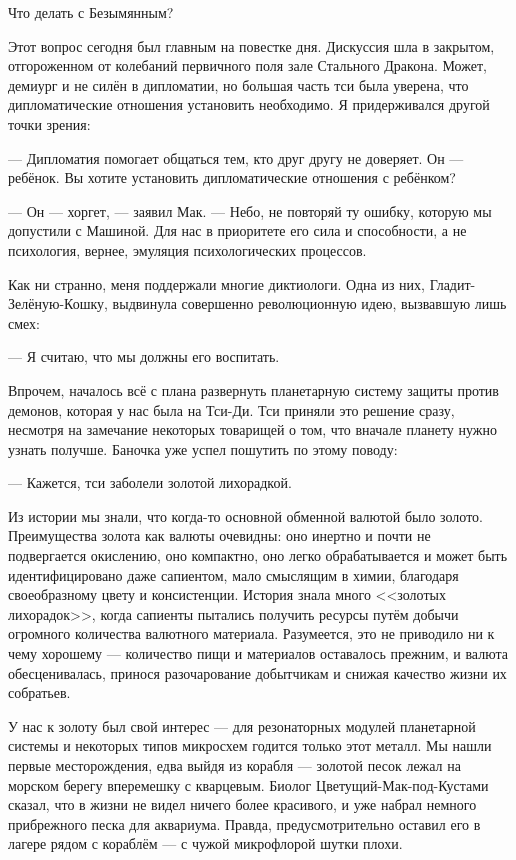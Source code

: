 Что делать с Безымянным?

Этот вопрос сегодня был главным на повестке дня.
Дискуссия шла в закрытом, отгороженном от колебаний первичного поля зале Стального Дракона.
Может, демиург и не силён в дипломатии, но большая часть тси была уверена, что дипломатические отношения установить необходимо.
Я придерживался другой точки зрения:

--- Дипломатия помогает общаться тем, кто друг другу не доверяет.
Он --- ребёнок.
Вы хотите установить дипломатические отношения с ребёнком?

--- Он --- хоргет, --- заявил Мак.
--- Небо, не повторяй ту ошибку, которую мы допустили с Машиной.
Для нас в приоритете его сила и способности, а не психология, вернее, эмуляция психологических процессов.

Как ни странно, меня поддержали многие диктиологи.
Одна из них, Гладит-Зелёную-Кошку, выдвинула совершенно революционную идею, вызвавшую лишь смех:

--- Я считаю, что мы должны его воспитать.

Впрочем, началось всё с плана развернуть планетарную систему защиты против демонов, которая у нас была на Тси-Ди.
Тси приняли это решение сразу, несмотря на замечание некоторых товарищей о том, что вначале планету нужно узнать получше.
Баночка уже успел пошутить по этому поводу:

--- Кажется, тси заболели золотой лихорадкой.

Из истории мы знали, что когда-то основной обменной валютой было золото.
Преимущества золота как валюты очевидны: оно инертно и почти не подвергается окислению, оно компактно, оно легко обрабатывается и может быть идентифицировано даже сапиентом, мало смыслящим в химии, благодаря своеобразному цвету и консистенции.
История знала много <<золотых лихорадок>>, когда сапиенты пытались получить ресурсы путём добычи огромного количества валютного материала.
Разумеется, это не приводило ни к чему хорошему --- количество пищи и материалов оставалось прежним, и валюта обесценивалась, принося разочарование добытчикам и снижая качество жизни их собратьев.

У нас к золоту был свой интерес --- для резонаторных модулей планетарной системы и некоторых типов микросхем годится только этот металл.
Мы нашли первые месторождения, едва выйдя из корабля --- золотой песок лежал на морском берегу вперемешку с кварцевым.
Биолог Цветущий-Мак-под-Кустами сказал, что в жизни не видел ничего более красивого, и уже набрал немного прибрежного песка для аквариума.
Правда, предусмотрительно оставил его в лагере рядом с кораблём --- с чужой микрофлорой шутки плохи.

